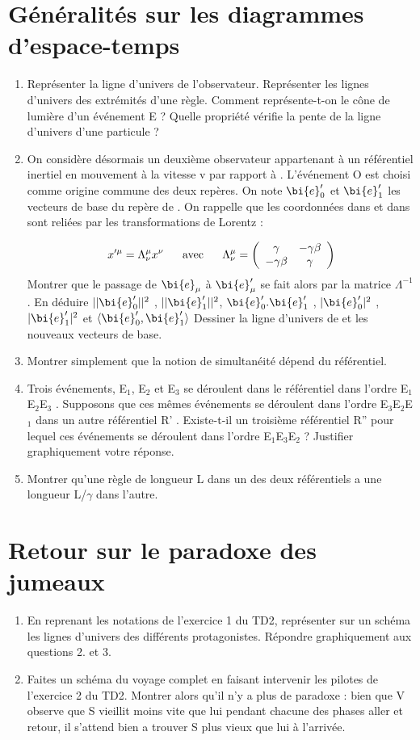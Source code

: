 \section{Généralités sur les diagrammes d’espace-temps}%
\begin{enumerate}
  \item Représenter la ligne d’univers de l’observateur. Représenter les lignes d’univers des extrémités d’une règle. Comment représente-t-on le cône de lumière d’un événement E ?
Quelle propriété vérifie la pente de la ligne d’univers d’une particule ?
  \item On considère désormais un deuxième observateur  appartenant à un référentiel inertiel
 en mouvement à la vitesse v par rapport à . L’événement O est choisi comme origine
commune des deux repères. On note $\bi{e}_0'$ et $\bi{e}_1'$ les vecteurs de base du repère de . On
rappelle que les coordonnées dans  et dans  sont reliées par les transformations de
Lorentz :

\[
x'^\mu = \Lambda^\mu_\nu x^\nu
\text{ \ \ \ \ avec \ \ \ \ }
\Lambda^\mu_\nu =
\left( \begin{array}{ c c }
 \gamma & -\gamma \beta \\ -\gamma \beta & \gamma
\end{array} \right)
\]
Montrer que le passage de
$\bi{e}_\mu$ à $\bi{e}_\mu'$
se fait alors par la matrice $\Lambda^{−1}$ . En déduire
$||\bi{e}_0'||^2$ , $||\bi{e}_1'||^2$,
$\bi{e}_0'.\bi{e}_1'$ , $|\bi{e}_0'|^2$ , $|\bi{e}_1'|^2$ et $\langle \bi{e}_0', \bi{e}_1' \rangle$ Dessiner la ligne d’univers de  et les nouveaux
vecteurs de base.
  \item Montrer simplement que la notion de simultanéité dépend du référentiel.
  \item Trois événements, E$_1$, E$_2$ et E$_3$ se déroulent dans le référentiel  dans l’ordre
  E$_1$E$_2$E$_3$ . Supposons que ces mêmes événements se déroulent dans l’ordre E$_3$E$_2$E$_1$ dans un autre référentiel {\mc R'} . Existe-t-il un troisième référentiel {\mc R''} pour lequel ces événements se déroulent dans
l’ordre E$_1$E$_3$E$_2$ ? Justifier graphiquement votre réponse.
  \item Montrer qu’une règle de longueur L dans un des deux référentiels a une longueur L/$\gamma$ dans
l’autre.
\end{enumerate}
\section{Retour sur le paradoxe des jumeaux}%
\begin{enumerate}
  \item En reprenant les notations de l’exercice 1 du TD2, représenter sur un schéma les lignes
d’univers des différents protagonistes. Répondre graphiquement aux questions 2. et 3.
  \item Faites un schéma du voyage complet en faisant intervenir les pilotes de l’exercice 2 du
TD2. Montrer alors qu’il n’y a plus de paradoxe : bien que V observe que S vieillit moins
vite que lui pendant chacune des phases aller et retour, il s’attend bien a trouver S plus
vieux que lui à l’arrivée.
\end{enumerate}

